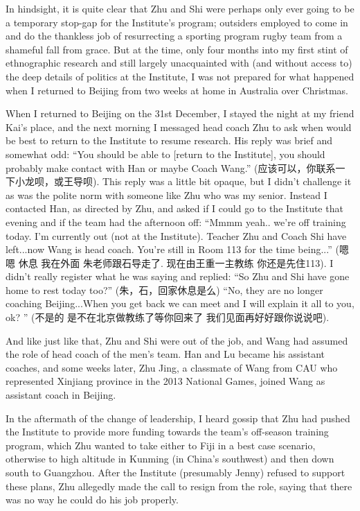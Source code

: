 \begin{CJK}{UTF8}{gbsn}
  In hindsight, it is quite clear that Zhu and Shi were perhaps only ever going to be a temporary stop-gap for the Institute's program; outsiders employed to come in and do the thankless job of resurrecting a sporting program rugby team from a shameful fall from grace.  But at the time, only four months into my first stint of ethnographic research and still largely unacquainted with (and without access to) the deep details of politics at the Institute, I was not prepared for what happened when I returned to Beijing from two weeks at home in Australia over Christmas.

  When I returned to Beijing on the 31st December, I stayed the night at my friend Kai's place, and the next morning I messaged head coach Zhu to ask when would be best to return to the Institute to resume research.  His reply was brief and somewhat odd: ``You should be able to [return to the Institute], you should probably make contact with Han or maybe Coach Wang.'' (应该可以，你联系一下小龙呗，或王导呗).  This reply was a little bit opaque, but I didn't challenge it as was the polite norm with someone like Zhu who was my senior.  Instead I contacted Han, as directed by Zhu, and asked if I could go to the Institute that evening and if the team had the afternoon off: ``Mmmm yeah.. we're off training today. I'm currently out (not at the Institute). Teacher Zhu and Coach Shi have left...now Wang is head coach.  You're still in Room 113 for the time being...'' (嗯嗯 休息 我在外面 朱老师跟石导走了. 现在由王重一主教练 你还是先住113).  I didn't really register what he was saying and replied:
  ``So Zhu and Shi have gone home to rest today too?'' (朱，石，回家休息是么)
  ``No, they are no longer coaching Beijing...When you get back we can meet and I will explain it all to you, ok? '' (不是的 是不在北京做教练了等你回来了 我们见面再好好跟你说说吧).

  And like just like that, Zhu and Shi were out of the job, and Wang had assumed the role of head coach of the men's team.  Han and Lu became his assistant coaches, and some weeks later, Zhu Jing, a classmate of Wang from CAU who represented Xinjiang province in the 2013 National Games, joined Wang as assistant coach in Beijing.

  In the aftermath of the change of leadership, I heard gossip that Zhu had pushed the Institute to provide more funding towards the team's off-season training program, which Zhu wanted to take either to Fiji in a best case scenario, otherwise to high altitude in Kunming (in China's southwest) and then down south to Guangzhou. After the Institute (presumably Jenny) refused to support these plans, Zhu allegedly made the call to resign from the role, saying that there was no way he could do his job properly.


\end{CJK}
